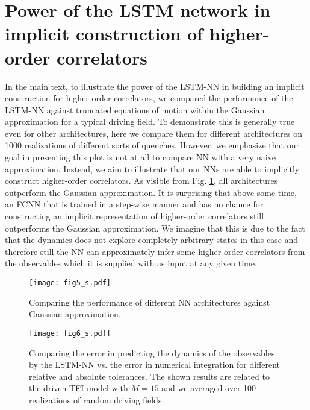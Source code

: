 \documentclass[a4paper,aps,amsmath,amssymb,twocolumn,longbibliography,,accepted=2022-05-17]{quantumarticle}
\begin{document}
\section{ Power of the LSTM network in implicit construction of higher-order correlators}
In the main text, to illustrate the power of the LSTM-NN in building an implicit construction for higher-order correlators, we compared the performance of the LSTM-NN against truncated equations of motion within the Gaussian approximation for a typical driving field. To demonstrate this is generally true even for other architectures, here we compare them for different architectures on 1000 realizations of different sorts of quenches. However, we emphasize that our goal in presenting this plot is not at all to compare NN with a very naive approximation. Instead, we aim to illustrate that our NNs are able to implicitly construct higher-order correlators. As visible from Fig. \ref{figS5}, all architectures outperform the Gaussian approximation. It is surprising that above some time, an FCNN that is trained in a step-wise manner and has no chance for constructing an implicit representation of higher-order correlators still outperforms the Gaussian approximation. We imagine that this is due to the fact that  the dynamics does not explore completely arbitrary states in this case and therefore still the NN can approximately infer some higher-order correlators from the observables which it is supplied with as input at any given time. %

\begin{figure}
	\centering
	\texttt{[image: fig5\_s.pdf]}
	\caption{Comparing the performance of different NN architectures against Gaussian approximation.}
	\label{figS5}
\end{figure}
\begin{figure}
	\centering
	\texttt{[image: fig6\_s.pdf]}
	\caption{ Comparing the error in predicting the dynamics of the observables by the LSTM-NN vs. the error in numerical integration for different relative  and  absolute tolerances. The shown results are related to the driven TFI model with $M=15$ and we averaged over 100 realizations of random driving fields.
	}
	\label{figS6}
\end{figure}
\end{document}
